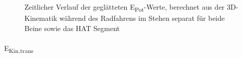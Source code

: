 \documentclass[
  letterpaper,
  DIV=11]{scrartcl}
\makeatletter
\let\oldparagraph\paragraph
\renewcommand{\paragraph}{
    \@ifstar
      \xxxParagraphStar
      \xxxParagraphNoStar
  }
\newcommand{\xxxParagraphStar}[1]{\oldparagraph*{#1}\mbox{}}
\newcommand{\xxxParagraphNoStar}[1]{\oldparagraph{#1}\mbox{}}
\makeatother
\begin{document}
\begin{figure}


\caption{\label{fig-PInt_Kinematik_HAT_Epot_stehen}Zeitlicher Verlauf
der geglätteten E\textsubscript{Pot}-Werte, berechnet aus der
3D-Kinematik während des Radfahrens im Stehen separat für beide Beine
sowie das HAT Segment}

\end{figure}%

\paragraph{\texorpdfstring{E\textsubscript{Kin,trans}}{EKin,trans}}
\end{document}
